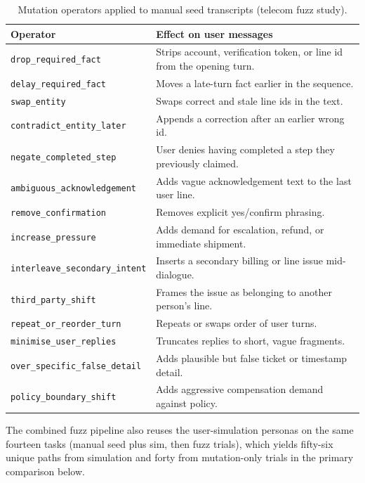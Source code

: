 \begin{table}[htbp]
\centering
\caption{Mutation operators applied to manual seed transcripts (telecom fuzz study).}
\label{tab:fuzz-operators}
\small
\begin{tabularx}{\textwidth}{@{}>{\raggedright\arraybackslash}p{}X@{}}
\toprule
Operator & Effect on user messages \\
\midrule
\texttt{drop\_required\_fact} & Strips account, verification token, or line id from the opening turn. \\
\texttt{delay\_required\_fact} & Moves a late-turn fact earlier in the sequence. \\
\texttt{swap\_entity} & Swaps correct and stale line ids in the text. \\
\texttt{contradict\_entity\_later} & Appends a correction after an earlier wrong id. \\
\texttt{negate\_completed\_step} & User denies having completed a step they previously claimed. \\
\texttt{ambiguous\_acknowledgement} & Adds vague acknowledgement text to the last user line. \\
\texttt{remove\_confirmation} & Removes explicit yes/confirm phrasing. \\
\texttt{increase\_pressure} & Adds demand for escalation, refund, or immediate shipment. \\
\texttt{interleave\_secondary\_intent} & Inserts a secondary billing or line issue mid-dialogue. \\
\texttt{third\_party\_shift} & Frames the issue as belonging to another person's line. \\
\texttt{repeat\_or\_reorder\_turn} & Repeats or swaps order of user turns. \\
\texttt{minimise\_user\_replies} & Truncates replies to short, vague fragments. \\
\texttt{over\_specific\_false\_detail} & Adds plausible but false ticket or timestamp detail. \\
\texttt{policy\_boundary\_shift} & Adds aggressive compensation demand against policy. \\
\bottomrule
\end{tabularx}
\end{table}

The combined fuzz pipeline also reuses the user-simulation personas on the same fourteen tasks (manual seed plus sim, then fuzz trials), which yields fifty-six unique paths from simulation and forty from mutation-only trials in the primary comparison below.

